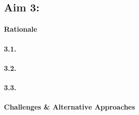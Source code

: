 \subsection{Aim 3: \SpecificAimThree}

\paragraph{Rationale}

\lipsum[1-1]

\paragraph{3.1. \SpecificAimThreeA}

\lipsum[2-2]

\paragraph{3.2. \SpecificAimThreeB}

\lipsum[3-3]

\paragraph{3.3. \SpecificAimThreeC}

\lipsum[4-4]

\paragraph{Challenges \& Alternative Approaches}

\lipsum[5-5]

